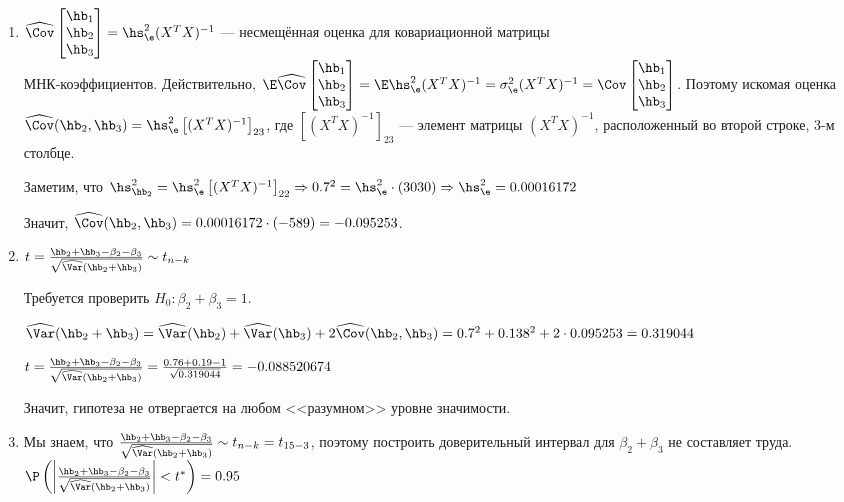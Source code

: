\documentclass[pdftex,11pt,openany]{book}\usepackage[]{graphicx}\usepackage[]{color}
\begin{document}
\begin{solution}
\begin{enumerate}
\item $\widehat{\Cov}\begin{bmatrix}
\hb_1 \\
\hb_2 \\
\hb_3 \\
\end{bmatrix} = \hs_{\e}^2 (X^TX)^{-1}$ --- несмещённая оценка для ковариационной матрицы \\ МНК-коэффициентов. Действительно, $\E\widehat{\Cov}\begin{bmatrix}
\hb_1 \\
\hb_2 \\
\hb_3 \\
\end{bmatrix} = \E\hs_{\e}^2 (X^TX)^{-1} = \sigma_{\e}^2 (X^TX)^{-1} = \Cov\begin{bmatrix}
\hb_1 \\
\hb_2 \\
\hb_3 \\
\end{bmatrix}$. Поэтому искомая оценка $\widehat{\Cov}(\hb_2, \hb_3) = \hs_{\e}^2 \left[ (X^T X)^{-1} \right]_{23}$, где $\left[ (X^T X)^{-1} \right]_{23}$ --- элемент матрицы $(X^T X)^{-1}$, расположенный во второй строке, 3-м столбце.

Заметим, что $\hs_{\hb_2}^2 = \hs_{\e}^2 \left[ (X^T X)^{-1} \right]_{22} \Rightarrow 0.7^2 = \hs_{\e}^2 \cdot (3030) \Rightarrow \hs_{\e}^2 = 0.00016172$

Значит, $\widehat{\Cov}(\hb_2, \hb_3) = 0.00016172 \cdot (-589) = -0.095253$.

\item $t = \frac{\hb_2 + \hb_3 - \beta_2 - \beta_3}{\sqrt{\widehat{\Var}(\hb_2 + \hb_3)}} \sim t_{n-k}$

Требуется проверить $H_0: \beta_2 + \beta_3 = 1$.

$\widehat{\Var}(\hb_2 + \hb_3) = \widehat{\Var}(\hb_2) + \widehat{\Var}(\hb_3) + 2\widehat{\Cov}(\hb_2, \hb_3) = 0.7^2 + 0.138^2 + 2 \cdot 0.095253 = 0.319044$

$t = \frac{\hb_2 + \hb_3 - \beta_2 - \beta_3}{\sqrt{\widehat{\Var}(\hb_2 + \hb_3)}} = \frac{0.76 + 0.19 - 1}{\sqrt{0.319044}} = -0.088520674$

Значит, гипотеза не отвергается на любом <<разумном>> уровне значимости.

\item Мы знаем, что $\frac{\hb_2 + \hb_3 - \beta_2 - \beta_3}{\sqrt{\widehat{\Var}(\hb_2 + \hb_3)}} \sim t_{n-k} = t_{15-3}$, поэтому построить доверительный интервал для $\beta_2 + \beta_3$ не составляет труда. $\P \left( \left| \frac{\hb_2 + \hb_3 - \beta_2 - \beta_3}{\sqrt{\widehat{\Var}(\hb_2 + \hb_3)}} \right| < t^* \right) = 0.95$


\end{enumerate}
\end{solution}
\end{document}
